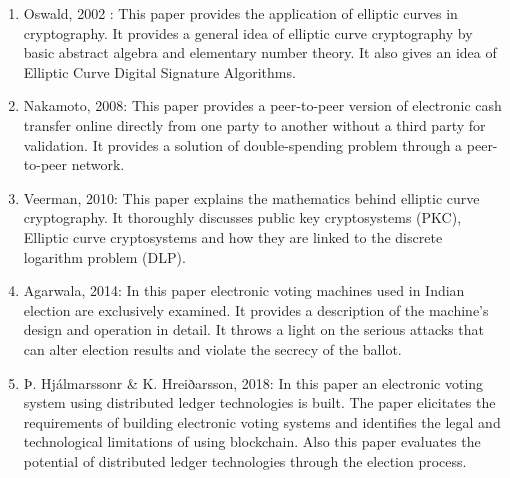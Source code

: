 \documentclass{report}
\begin{document}
\begin{enumerate}
    \item Oswald, 2002 :  This paper provides the application of elliptic curves in cryptography. It provides a general idea of elliptic curve cryptography by basic abstract algebra and elementary number theory. It also gives an idea of Elliptic Curve Digital Signature Algorithms.

\item Nakamoto, 2008:  This paper provides a peer-to-peer version of electronic cash transfer online directly from one party to another without a third party for validation. It provides a solution of double-spending problem through a peer-to-peer network.

\item Veerman, 2010: This paper explains the mathematics behind elliptic curve cryptography. It thoroughly discusses public key cryptosystems (PKC), Elliptic
curve cryptosystems and how they are linked to the discrete
logarithm problem (DLP). 

\item Agarwala, 2014: In this paper electronic voting machines used in Indian election are exclusively examined. It provides a 
description of the machine’s design and operation in detail. 
It throws a light on the serious attacks that can alter election results and
violate the secrecy of the ballot. 

\item Þ. Hjálmarssonr & K. Hreiðarsson, 2018: In this paper an electronic voting system using distributed ledger technologies is built. The paper elicitates the requirements of building electronic voting systems and identifies the legal and technological
limitations of using blockchain. Also this paper evaluates the potential of distributed ledger technologies
through the election process. 



\end{enumerate}
\end{document}
